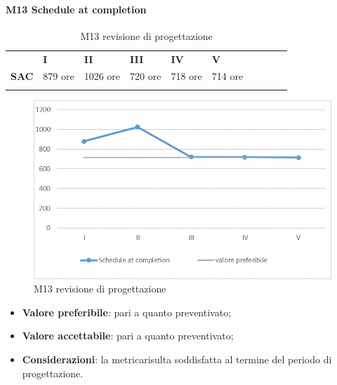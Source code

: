 \paragraph{M13 Schedule at completion} \mbox{}
\begin{longtable}[H!] {						
	>{}p{18mm}  		
	>{}p{16mm}
	>{}p{16mm}		
	>{}p{16mm}		
	>{}p{16mm}		
	>{}p{16mm}		
	>{}p{16mm}
	>{}p{16mm}
	>{}p{16mm}
	>{}p{16mm}
	}
	\rowcolor{gray!50}
	\textbf{} & \textbf{I} & \textbf{II} & \textbf{III} & \textbf{IV} & \textbf{V} \TBstrut \\ [2mm]
	\textbf{SAC} & 879 ore & 1026 ore & 720 ore & 718 ore & 714 ore \TBstrut \\ [2mm]
	\rowcolor{white}
	\caption{M13 revisione di progettazione\glo}
\end{longtable}
\begin{figure}[H] 	
\includegraphics[width=\linewidth]{./img/grafici/RP10.png}	
\caption{M13 revisione di progettazione\glo}	
\end{figure}
\begin{itemize}
	\item \textbf{Valore preferibile}: pari a quanto preventivato;
	\item \textbf{Valore accettabile}: pari a quanto preventivato;
	\item \textbf{Considerazioni}: la metrica\glosp risulta soddisfatta al termine del periodo di progettazione\glo.
\end{itemize}

